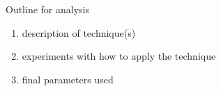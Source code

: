 Outline for analysis 

\begin{enumerate}
\item description of technique(s)
\item experiments with how to apply the technique
\item final parameters used
\end{enumerate}